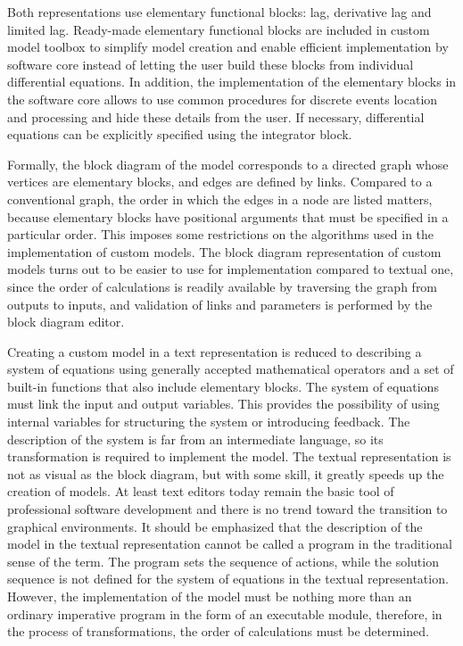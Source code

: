 \documentclass[lettersize,journal]{IEEEtran}
\begin{document}
Both representations use elementary functional blocks: lag, derivative lag and limited lag. Ready-made elementary functional
blocks are included in custom model toolbox to simplify model creation and enable efficient implementation by software core 
instead of letting the user build these blocks from individual differential equations.
In addition, the implementation of the elementary blocks in the software core allows to use common procedures for discrete events 
location and processing and hide these details from the user. 
If necessary, differential equations can be explicitly specified using the integrator block.

Formally, the block diagram of the model corresponds to a directed graph whose vertices are elementary blocks, and
edges are defined by links. Compared to a conventional graph, the order in which the edges in a node are listed matters,
because elementary blocks have positional arguments that must be specified in a particular order. This imposes some restrictions
on the algorithms used in the implementation of custom models. The block diagram representation of custom models
turns out to be easier to use for implementation compared to textual one, since the order of calculations is readily
available by traversing the graph from outputs to inputs, and validation of links and parameters is performed by the 
block diagram editor.

Creating a custom model in a text representation is reduced to describing a system of equations using generally accepted
mathematical operators and a set of built-in functions that also include elementary blocks. The system of equations must 
link the input and output variables. This provides the possibility of using internal variables for structuring the 
system or introducing feedback. The description of the system is far from an intermediate language, so its transformation 
is required to implement the model. The textual representation is not as visual as the block diagram, 
but with some skill, it greatly speeds up the creation of models. At least text editors today remain the basic tool 
of professional software development and there is no trend toward the transition to graphical environments. 
It should be emphasized that the description of the model in the textual representation cannot be called a program in the
traditional sense of the term. The program sets the sequence of actions, while the solution sequence is not defined for the 
system of equations in the textual representation. However, the implementation of the model must be nothing more than an ordinary
imperative program in the form of an executable module, therefore, in the process of transformations, 
the order of calculations must be determined.
\end{document}
